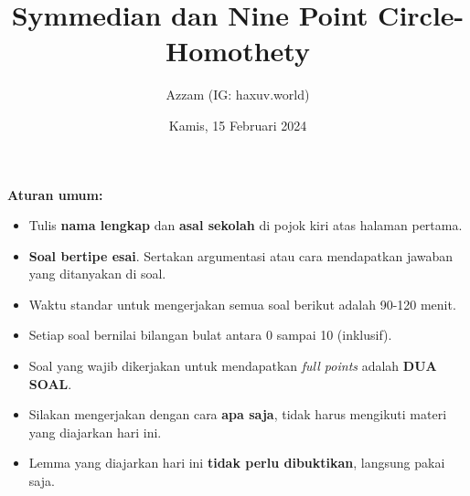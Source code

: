 \documentclass[11pt]{scrartcl}
\title{Symmedian dan Nine Point Circle-Homothety}
\author{Azzam (IG: haxuv.world)}
\date{Kamis, 15 Februari 2024}
\begin{document}
\maketitle
\textbf{Aturan umum:}
\begin{itemize}
    \item Tulis \textbf{nama lengkap} dan \textbf{asal sekolah} di pojok kiri atas halaman pertama.
    \item \textbf{Soal bertipe esai}. Sertakan argumentasi atau cara mendapatkan jawaban yang ditanyakan di soal.
    \item Waktu standar untuk mengerjakan semua soal berikut adalah 90-120 menit.
    \item Setiap soal bernilai bilangan bulat antara 0 sampai 10 (inklusif).
    \item Soal yang wajib dikerjakan untuk mendapatkan \textit{full points} adalah \textbf{DUA SOAL}.
    \item Silakan mengerjakan dengan cara \textbf{apa saja}, tidak harus mengikuti materi yang diajarkan hari ini.
    \item Lemma yang diajarkan hari ini \textbf{tidak perlu dibuktikan}, langsung pakai saja.
\end{itemize}

\newpage
\end{document}
